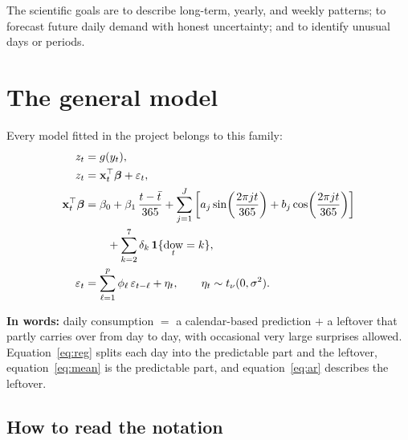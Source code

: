 \documentclass[11pt]{article}
\DeclareMathOperator{\dow}{dow}
\begin{document}
The scientific goals are to describe long-term, yearly, and weekly patterns; to
forecast future daily demand with honest uncertainty; and to identify unusual
days or periods.

\section{The general model}

Every model fitted in the project belongs to this family:
\begin{align}
z_t &= g(y_t), \label{eq:link}\\
z_t &= \mathbf{x}_t^{\top}\boldsymbol\beta + \varepsilon_t, \label{eq:reg}\\
\mathbf{x}_t^{\top}\boldsymbol\beta
  &= \beta_0 + \beta_1\,\frac{t-\bar t}{365}
   + \sum_{j=1}^{J}\left[a_j \sin\!\left(\frac{2\pi j t}{365}\right)
   + b_j \cos\!\left(\frac{2\pi j t}{365}\right)\right] \notag\\
  &\qquad + \sum_{k=2}^{7}\delta_k\,\mathbf{1}\{\dow_t = k\}, \label{eq:mean}\\
\varepsilon_t &= \sum_{\ell=1}^{p}\phi_\ell\,\varepsilon_{t-\ell} + \eta_t,
  \qquad \eta_t \sim t_\nu(0,\sigma^2). \label{eq:ar}
\end{align}

\noindent\textbf{In words:} daily consumption $=$ a calendar-based prediction
$+$ a leftover that partly carries over from day to day, with occasional very
large surprises allowed. Equation~\eqref{eq:reg} splits each day into the
predictable part and the leftover, equation~\eqref{eq:mean} is the predictable
part, and equation~\eqref{eq:ar} describes the leftover.

\subsection{How to read the notation}
\end{document}
